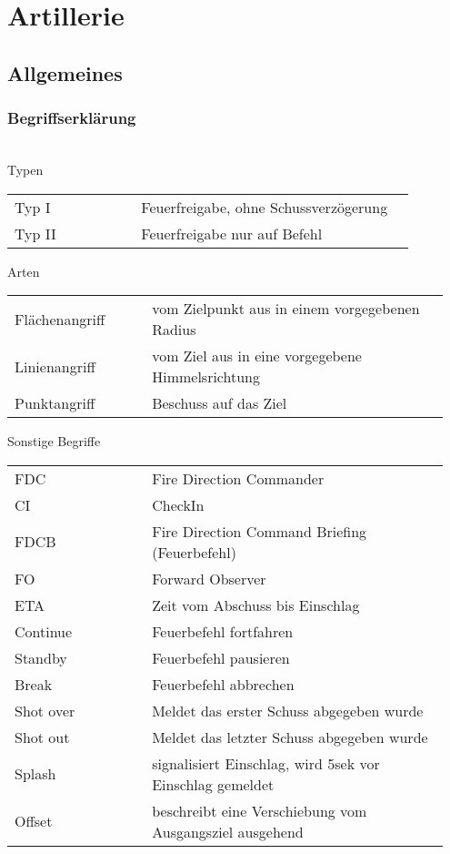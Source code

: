 \newpage
\section{Artillerie}
\subsection{Allgemeines}
\subsubsection{Begriffserklärung} \hfil\\
	Typen
	\begin{longtable}{p{0.3\linewidth} p{0.65\linewidth}}
		Typ I 		& 	Feuerfreigabe, ohne Schussverzögerung \\
		Typ II 		&	Feuerfreigabe nur auf Befehl \\
	\end{longtable}

	Arten
	\begin{longtable}{p{0.3\linewidth} p{0.65\linewidth}}
		Flächenangriff 	&	vom Zielpunkt aus in einem vorgegebenen Radius \\
		Linienangriff 	&	vom Ziel aus in eine vorgegebene Himmelsrichtung \\
		Punktangriff 	&	Beschuss auf das Ziel \\
	\end{longtable}

	Sonstige Begriffe

	\begin{longtable}{p{0.3\linewidth} p{0.65\linewidth}}
		FDC 		&		Fire Direction Commander \\
		CI  		&		CheckIn \\
		FDCB 		&		Fire Direction Command Briefing (Feuerbefehl) \\
		FO  		&		Forward Observer \\
		ETA  		&		Zeit vom Abschuss bis Einschlag \\
		Continue 	&		Feuerbefehl fortfahren \\
		Standby 	&		Feuerbefehl pausieren \\
		Break  		&		Feuerbefehl abbrechen \\
		Shot over  	&		Meldet das erster Schuss abgegeben wurde \\
		Shot out  	&		Meldet das letzter Schuss abgegeben wurde \\
		Splash  	&		signalisiert Einschlag, wird 5sek vor Einschlag gemeldet \\
		Offset  	&		beschreibt eine Verschiebung vom Ausgangsziel ausgehend \\
	\end{longtable}

